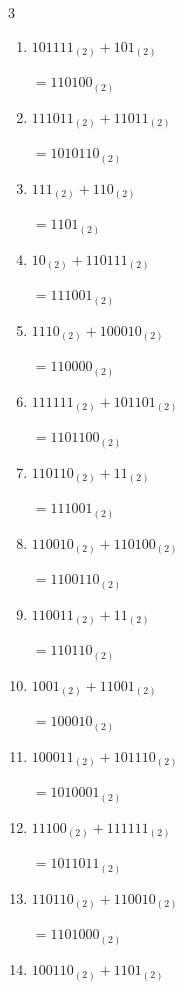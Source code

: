 \begin{multicols}{3}
\begin{enumerate}
\columnbreak %

\resetques

  \item $101111_{(2)} + 101_{(2)}$

        $=110100_{(2)}$

  \item $111011_{(2)} + 11011_{(2)}$

        $=1010110_{(2)}$

  \item $111_{(2)} + 110_{(2)}$

        $=1101_{(2)}$

  \item $10_{(2)} + 110111_{(2)}$

        $=111001_{(2)}$

  \item $1110_{(2)} + 100010_{(2)}$

        $=110000_{(2)}$

  \item $111111_{(2)} + 101101_{(2)}$

        $=1101100_{(2)}$

  \item $110110_{(2)} + 11_{(2)}$

        $=111001_{(2)}$

  \item $110010_{(2)} + 110100_{(2)}$

        $=1100110_{(2)}$

  \item $110011_{(2)} + 11_{(2)}$

        $=110110_{(2)}$

  \item $1001_{(2)} + 11001_{(2)}$

        $=100010_{(2)}$

\columnbreak %

  \item $100011_{(2)} + 101110_{(2)}$

        $=1010001_{(2)}$

  \item $11100_{(2)} + 111111_{(2)}$

        $=1011011_{(2)}$

  \item $110110_{(2)} + 110010_{(2)}$

        $=1101000_{(2)}$

  \item $100110_{(2)} + 1101_{(2)}$


\end{enumerate}
\end{multicols}
